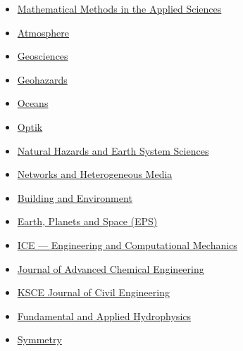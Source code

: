 \documentclass[final, a4paper, oneside, 12pt]{article}
\numberwithin{equation}{section}
\begin{document}
\begin{itemize}
    \item \href{https://onlinelibrary.wiley.com/journal/10991476/}%
    {Mathematical Methods in the Applied Sciences}

    \item \href{https://www.mdpi.com/journal/atmosphere/}%
    {Atmosphere}
    
    \item \href{https://www.mdpi.com/journal/geosciences/}%
    {Geosciences}

    \item \href{https://www.mdpi.com/journal/geohazards/}%
    {Geohazards}

    \item \href{https://www.mdpi.com/journal/oceans/}%
    {Oceans}
    
    \item \href{https://www.sciencedirect.com/journal/optik/}%
    {Optik}
    
    \item \href{http://www.nat-hazards-earth-syst-sci.net/}%
    {Natural Hazards and Earth System Sciences}

    \item \href{https://www.aimspress.com/journal/nhm/}%
    {Networks and Heterogeneous Media}

    \item \href{https://www.sciencedirect.com/journal/building-and-environment}%
    {Building and Environment}
    
    \item \href{http://www.terrapub.co.jp/journals/EPS/}%
    {Earth, Planets and Space (EPS)}
    
    \item \href{http://www.icevirtuallibrary.com/content/serial/eacm/}%
    {ICE --- Engineering and Computational Mechanics}
    
    \item \href{http://www.ashdin.com/journals/jace/jace.aspx}%
    {Journal of Advanced Chemical Engineering}
    
    \item \href{http://www.springer.com/engineering/civil+engineering/journal/12205}%
    {KSCE Journal of Civil Engineering}
    
    \item \href{http://hydrophysics.info/?lang=en}%
    {Fundamental and Applied Hydrophysics}
    
    \item \href{http://www.mdpi.com/journal/symmetry}%
    {Symmetry}
    

\end{itemize}
\end{document}
